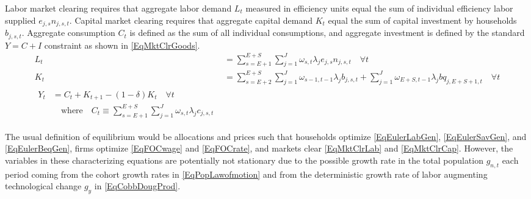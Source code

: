 \documentclass[letterpaper,12pt]{article}
\theoremstyle{definition}
\begin{document}
\begin{spacing}{1.5}
    Labor market clearing requires that aggregate labor demand $L_t$ measured in efficiency units equal the sum of individual efficiency labor supplied $e_{j,s}n_{j,s,t}$. Capital market clearing requires that aggregate capital demand $K_t$ equal the sum of capital investment by households $b_{j,s,t}$. Aggregate consumption $C_t$ is defined as the sum of all individual consumptions, and aggregate investment is defined by the standard $Y = C + I$ constraint as shown in \eqref{EqMktClrGoods}.
    \begin{align}
      L_t &= \sum_{s=E+1}^{E+S}\sum_{j=1}^{J} \omega_{s,t}\lambda_j e_{j,s}n_{j,s,t} \quad \forall t \label{EqMktClrLab} \\
      K_t &= \sum_{s=E+2}^{E+S}\sum_{j=1}^{J}\omega_{s-1,t-1}\lambda_j b_{j,s,t} + \sum_{j=1}^{J}\omega_{E+S,t-1}\lambda_j bq_{j,E+S+1,t} \quad \forall t \label{EqMktClrCap} \\
      \begin{split}
        Y_t &= C_t + K_{t+1} - (1-\delta)K_t \quad\forall t \\
        &\quad\text{where}\quad C_t \equiv \sum_{s=E+1}^{E+S}\sum_{j=1}^{J}\omega_{s,t}\lambda_j c_{j,s,t}
      \end{split} \label{EqMktClrGoods}
    \end{align}

    The usual definition of equilibrium would be allocations and prices such that households optimize \eqref{EqEulerLabGen}, \eqref{EqEulerSavGen}, and \eqref{EqEulerBeqGen}, firms optimize \eqref{EqFOCwage} and \eqref{EqFOCrate}, and markets clear \eqref{EqMktClrLab} and \eqref{EqMktClrCap}. However, the variables in these characterizing equations are potentially not stationary due to the possible growth rate in the total population $g_{n,t}$ each period coming from the cohort growth rates in \eqref{EqPopLawofmotion} and from the deterministic growth rate of labor augmenting technological change $g_y$ in \eqref{EqCobbDougProd}.


\end{spacing}
\end{document}
